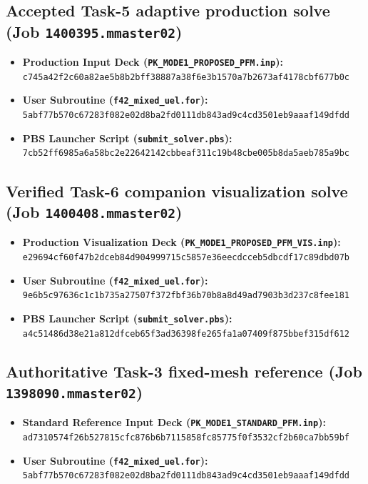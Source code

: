 \subsection{Accepted Task-5 adaptive production solve (Job \texttt{1400395.mmaster02})}
\begin{itemize}
  \item \textbf{Production Input Deck (\texttt{PK\_MODE1\_PROPOSED\_PFM.inp}):} \\
  \texttt{c745a42f2c60a82ae5b8b2bff38887a38f6e3b1570a7b2673af4178cbf677b0c}
  \item \textbf{User Subroutine (\texttt{f42\_mixed\_uel.for}):} \\
  \texttt{5abf77b570c67283f082e02d8ba2fd0111db843ad9c4cd3501eb9aaaf149dfdd}
  \item \textbf{PBS Launcher Script (\texttt{submit\_solver.pbs}):} \\
  \texttt{7cb52ff6985a6a58bc2e22642142cbbeaf311c19b48cbe005b8da5aeb785a9bc}
\end{itemize}

\subsection{Verified Task-6 companion visualization solve (Job \texttt{1400408.mmaster02})}
\begin{itemize}
  \item \textbf{Production Visualization Deck (\texttt{PK\_MODE1\_PROPOSED\_PFM\_VIS.inp}):} \\
  \texttt{e29694cf60f47b2dceb84d904999715c5857e36eecdcceb5dbcdf17c89dbd07b}
  \item \textbf{User Subroutine (\texttt{f42\_mixed\_uel.for}):} \\
  \texttt{9e6b5c97636c1c1b735a27507f372fbf36b70b8a8d49ad7903b3d237c8fee181}
  \item \textbf{PBS Launcher Script (\texttt{submit\_solver.pbs}):} \\
  \texttt{a4c51486d38e21a812dfceb65f3ad36398fe265fa1a07409f875bbef315df612}
\end{itemize}

\subsection{Authoritative Task-3 fixed-mesh reference (Job \texttt{1398090.mmaster02})}
\begin{itemize}
  \item \textbf{Standard Reference Input Deck (\texttt{PK\_MODE1\_STANDARD\_PFM.inp}):} \\
  \texttt{ad7310574f26b527815cfc876b6b7115858fc85775f0f3532cf2b60ca7bb59bf}
  \item \textbf{User Subroutine (\texttt{f42\_mixed\_uel.for}):} \\
  \texttt{5abf77b570c67283f082e02d8ba2fd0111db843ad9c4cd3501eb9aaaf149dfdd}
\end{itemize}

